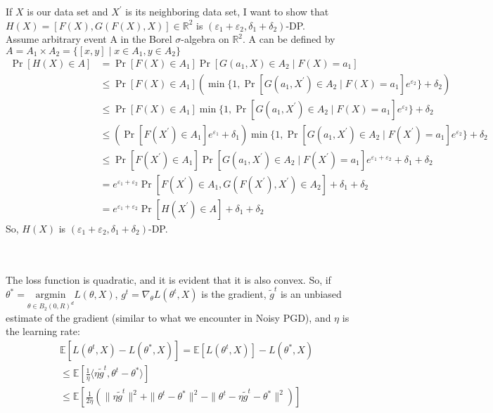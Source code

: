 \documentclass[12pt]{extarticle}
\begin{document}
If $X$ is our data set and $X^{'}$ is its neighboring data set, I want to show that $H(X) = [F(X), G(F(X), X)] \in \mathbb{R}^2$ is $(\varepsilon_1 + \varepsilon_2, \delta_1 + \delta_2)$-DP.\\
Assume arbitrary event A in the Borel $\sigma$-algebra on $\mathbb{R}^2$. A can be defined by $A = A_1 \times A_2 = \{[x, y] \mid x \in A_1, y \in A_2\}$
\begin{align*}
	\Pr[H(X) \in A] &= \Pr[F(X) \in A_1] \Pr[ G(a_1,X) \in A_2 \mid F(X) = a_1] \\
	&\leq \Pr[F(X) \in A_1] \left( \min\{1, \Pr[ G(a_1,X^{'}) \in A_2 \mid F(X) = a_1]e^{\varepsilon_2}\} + \delta_2 \right) \\
	&\leq \Pr[F(X) \in A_1] \min\{1, \Pr[ G(a_1,X^{'}) \in A_2 \mid F(X) = a_1]e^{\varepsilon_2}\} + \delta_2  \\
	&\leq (\Pr[F(X^{'}) \in A_1]e^{\varepsilon_1}+\delta_1) \min\{1, \Pr[ G(a_1,X^{'}) \in A_2 \mid F(X^{'}) = a_1]e^{\varepsilon_2}\} + \delta_2  \\
	&\leq \Pr[F(X^{'}) \in A_1]\Pr[ G(a_1,X^{'}) \in A_2 \mid F(X^{'}) = a_1]e^{\varepsilon_1+\varepsilon_2}+\delta_1+\delta_2\\
	& = e^{\varepsilon_1+\varepsilon_2}\Pr[F(X^{'}) \in A_1, G(F(X^{'}),X^{'})\in A_2]+\delta_1+\delta_2\\
	& =  e^{\varepsilon_1+\varepsilon_2}\Pr[H(X^{'}) \in A]+\delta_1+\delta_2
\end{align*}
So, $H(X)$ is $(\varepsilon_1 + \varepsilon_2, \delta_1 + \delta_2)$-DP.
\\\\	\\The loss function is quadratic, and it is evident that it is also convex. So, if $\theta^{*}=\underset{\theta \in B_2(0, R)^d}{\mathrm{argmin}} L(\theta, X)$, $g^t = \nabla_\theta L(\theta^t, X)$ is the gradient, $\tilde{g}^{t}$ is an unbiased estimate of the gradient (similar to what we encounter in Noisy PGD), and $\eta$ is the learning rate:\\
\begin{align*}
	&\mathbb{E}[L(\theta^t, X) -  L(\theta^{*}, X)] = \mathbb{E}[L(\theta^t, X)] -  L(\theta^{*}, X) \\
	&\le \mathbb{E}\left[\frac{1}{\eta}\langle \eta \tilde{g}^{t}, \theta^{t} - \theta^{*} \rangle\right] \\
	&\leq \mathbb{E}\left[\frac{1}{2\eta}\left(\|\eta \tilde{g}^{t}\|^2 + \|\theta^{t} - \theta^{*}\|^2 - \|\theta^{t}-\eta \tilde{g}^{t} - \theta^{*}\|^2\right)\right] \\
\end{align*}
\end{document}
